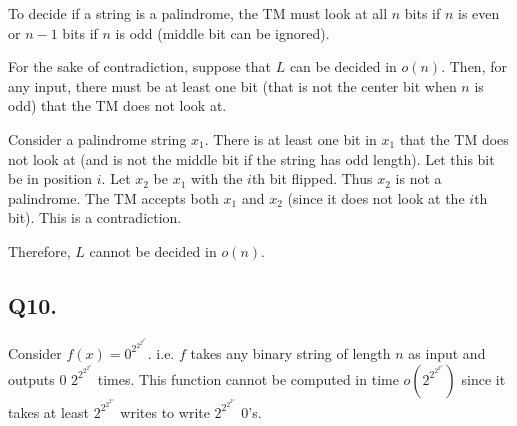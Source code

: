 \documentclass[letterpaper]{article}
\begin{document}
To decide if a string is a palindrome, the TM must look at all
$n$ bits if $n$ is even or $n-1$ bits if $n$ is odd
(middle bit can be ignored).

For the sake of contradiction, suppose that $L$ can be decided in
$o(n)$. Then, for any input, there must be at least one bit
(that is not the center bit when $n$ is odd)
that the TM does not look at.

Consider a palindrome string $x_1$.
There is at least one bit in $x_1$ that the TM does not look at
(and is not the middle bit if the string has odd length).
Let this bit be in position $i$.
Let $x_2$ be $x_1$ with the $i$th bit flipped. Thus $x_2$ is not a palindrome.
The TM accepts both $x_1$ and $x_2$ (since it does not look at the $i$th bit).
This is a contradiction.

Therefore, $L$ cannot be decided in $o(n)$.

\subsection*{Q10.}

Consider $f(x) = 0^{2^{2^{2^{2^n}}}}$. i.e. $f$ takes any binary string of
length $n$ as input and outputs 0 $2^{2^{2^{2^n}}}$ times. This function
cannot be computed in time $o(2^{2^{2^{2^n}}})$ since it takes at least
$2^{2^{2^{2^n}}}$ writes to write $2^{2^{2^{2^n}}}$ 0's.
\end{document}
